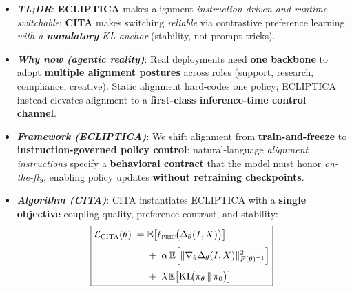 \documentclass[11pt]{article}
\begin{document}
\begin{abstract}
\end{abstract}


\begin{defin}
\scriptsize
\vspace{-2mm}
\begin{itemize}[left=-4pt,itemsep=0pt,topsep=0pt,parsep=0pt]

\item[\faBolt] \textbf{\textit{TL;DR}}:
\textbf{ECLIPTICA} makes alignment \emph{instruction-driven and runtime-switchable};
\textbf{CITA} makes switching \emph{reliable} via contrastive preference learning \emph{with a \textbf{mandatory} KL anchor} (stability, not prompt tricks).

\item[\faGlobeAmericas] \textbf{\textit{Why now (agentic reality)}}:
Real deployments need \textbf{one backbone} to adopt \textbf{multiple alignment postures} across roles (support, research, compliance, creative).
Static alignment hard-codes one policy; ECLIPTICA instead elevates alignment to a \textbf{first-class inference-time control channel}.

\item[\faCompass] \textbf{\textit{Framework (ECLIPTICA)}}:
We shift alignment from \textbf{train-and-freeze} to \textbf{instruction-governed policy control}:
natural-language \emph{alignment instructions} specify a \textbf{behavioral contract} that the model must honor \emph{on-the-fly}, enabling policy updates \textbf{without retraining checkpoints}.

\item[\faCogs] \textbf{\textit{Algorithm (CITA)}}:
CITA instantiates ECLIPTICA with a \textbf{single objective} coupling quality, preference contrast, and stability:
\vspace{-1em}
\[
\boxed{
\begin{aligned}
\mathcal{L}_{\textsc{CITA}}(\theta)
\;=\;&
\mathbb{E}\!\left[\ell_{\textsc{pref}}\!\big(\Delta_\theta(I,X)\big)\right]
\\[0.25em]
&+\;
\alpha\,\mathbb{E}\!\left[\|\nabla_\theta \Delta_\theta(I,X)\|_{F(\theta)^{-1}}^{2}\right]
\\[0.25em]
&+\;
\lambda\,\mathbb{E}\!\left[\mathrm{KL}\!\big(\pi_\theta \,\|\, \pi_0\big)\right]
\end{aligned}
}
\]
\vspace{-1.5em}


\end{itemize}
\end{defin}
\end{document}
